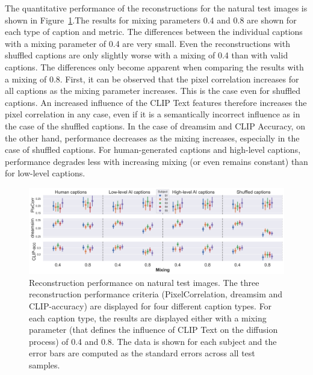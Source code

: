 The quantitative performance of the reconstructions for the natural test images is shown in Figure~\ref{fig:aicap_reconstruction_test_both_mixings}.The results for mixing parameters 0.4 and 0.8 are shown for each type of caption and metric. The differences between the individual captions with a mixing parameter of 0.4 are very small. Even the reconstructions with shuffled captions are only slightly worse with a mixing of 0.4 than with valid captions. The differences only become apparent when comparing the results with a mixing of 0.8. First, it can be observed that the pixel correlation increases for all captions as the mixing parameter increases. This is the case even for shuffled captions. An increased influence of the CLIP Text features therefore increases the pixel correlation in any case, even if it is a semantically incorrect influence as in the case of the shuffled captions. In the case of dreamsim and CLIP Accuracy, on the other hand, performance decreases as the mixing increases, especially in the case of shuffled captions. For human-generated captions and high-level captions, performance degrades less with increasing mixing (or even remains constant) than for low-level captions. 
\begin{figure}[ht]
    \centering
    \includegraphics[width=1\textwidth]{plots/aicap_reconstruction_test_both_mixings.png}
    \caption[Experiment 2: Reconstruction performance on natural test images]{Reconstruction performance on natural test images. The three reconstruction performance criteria (PixelCorrelation, dreamsim and CLIP-accuracy) are displayed for four different caption types. For each caption type, the results are displayed either with a mixing parameter (that defines the influence of CLIP Text on the diffusion process) of 0.4 and 0.8. The data is shown for each subject and the error bars are computed as the standard errors across all test samples.}\label{fig:aicap_reconstruction_test_both_mixings}
\end{figure}


